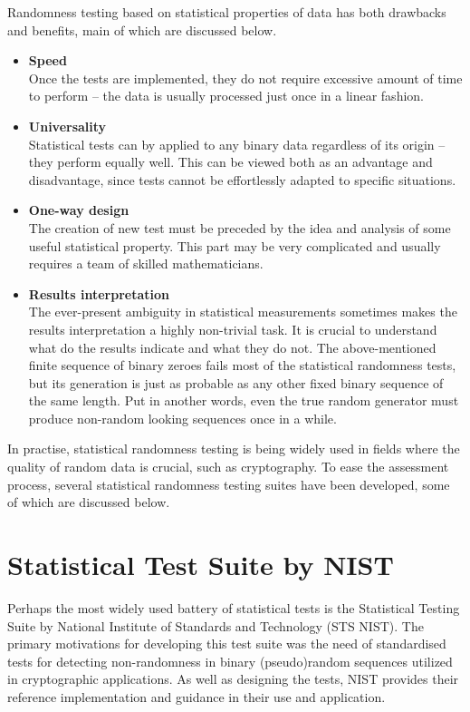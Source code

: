 \documentclass[12pt,oneside]{fithesis2}
\begin{document}
Randomness testing based on statistical properties of data has both drawbacks and benefits, main of which are discussed below.
\begin{itemize} \rightskip=2em
\item \textbf{Speed}\\
Once the tests are implemented, they do not require excessive amount of time to perform -- 
the data is usually processed just once in a linear fashion.
\item \textbf{Universality}\\
Statistical tests can by applied to any binary data regardless of its origin -- they perform equally well. 
This can be viewed both as an advantage and disadvantage, since tests cannot be effortlessly adapted to specific situations.
\item \textbf{One-way design}\\
The creation of new test must be preceded by the idea and analysis of some useful statistical property. This part may be 
very complicated and usually requires a team of skilled mathematicians.
\item \textbf{Results interpretation}\\
The ever-present ambiguity in statistical measurements sometimes makes the results interpretation a highly non-trivial task.
It is crucial to understand what do the results indicate and what they do not. The above-mentioned finite sequence of binary zeroes
fails most of the statistical randomness tests, but its generation is just as probable 
as any other fixed binary sequence of the same length.
Put in another words, even the true random generator must produce non-random looking sequences once in a while.
\end{itemize}

\noindent
In practise, statistical randomness testing is being widely used in fields where the quality of random data is crucial, 
such as cryptography. To ease the assessment process, several statistical randomness testing suites have been developed, 
some of which are discussed below.

\section{Statistical Test Suite by NIST}
\label{sec:sts-nist}

Perhaps the most widely used battery of statistical tests is the Statistical Testing Suite 
by National Institute of Standards and Technology (STS NIST).
The primary motivations for developing this test suite was the need of standardised tests for detecting non-randomness 
in binary (pseudo)random sequences utilized in cryptographic applications. As well as designing the tests,
NIST provides their reference implementation and guidance in their use and application. \parencite{sts-nist}
\end{document}
